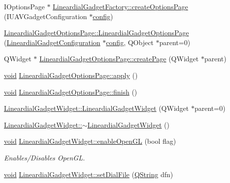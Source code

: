 \begin{DoxyCompactItemize}
\item 
I\-Options\-Page $\ast$ \hyperlink{group___linear_dial_plugin_gab8b7a7edac05d576e192c715acf48a22}{Lineardial\-Gadget\-Factory\-::create\-Options\-Page} (I\-U\-A\-V\-Gadget\-Configuration $\ast$\hyperlink{deflate_8c_a4473b5227787415097004fd39f55185e}{config})
\item 
\hyperlink{group___linear_dial_plugin_gaa49909f8404b5303882872f6bb8ccdb2}{Lineardial\-Gadget\-Options\-Page\-::\-Lineardial\-Gadget\-Options\-Page} (\hyperlink{class_lineardial_gadget_configuration}{Lineardial\-Gadget\-Configuration} $\ast$\hyperlink{deflate_8c_a4473b5227787415097004fd39f55185e}{config}, Q\-Object $\ast$parent=0)
\item 
Q\-Widget $\ast$ \hyperlink{group___linear_dial_plugin_ga7498a19341fff9fe87afe47efb379a00}{Lineardial\-Gadget\-Options\-Page\-::create\-Page} (Q\-Widget $\ast$parent)
\item 
\hyperlink{group___u_a_v_objects_plugin_ga444cf2ff3f0ecbe028adce838d373f5c}{void} \hyperlink{group___linear_dial_plugin_gace7e2623dbc910a445c0f4f772fb85cb}{Lineardial\-Gadget\-Options\-Page\-::apply} ()
\item 
\hyperlink{group___u_a_v_objects_plugin_ga444cf2ff3f0ecbe028adce838d373f5c}{void} \hyperlink{group___linear_dial_plugin_ga5afd30269776667128093b5ec5bef9de}{Lineardial\-Gadget\-Options\-Page\-::finish} ()
\item 
\hyperlink{group___linear_dial_plugin_ga67af774f5fa476bda0dce880d57348a7}{Lineardial\-Gadget\-Widget\-::\-Lineardial\-Gadget\-Widget} (Q\-Widget $\ast$parent=0)
\item 
\hyperlink{group___linear_dial_plugin_ga46b2275fc21a5a5fc14809f31be48674}{Lineardial\-Gadget\-Widget\-::$\sim$\-Lineardial\-Gadget\-Widget} ()
\item 
\hyperlink{group___u_a_v_objects_plugin_ga444cf2ff3f0ecbe028adce838d373f5c}{void} \hyperlink{group___linear_dial_plugin_ga6963a6b647b9d9def0497b60df89d576}{Lineardial\-Gadget\-Widget\-::enable\-Open\-G\-L} (bool flag)
\begin{DoxyCompactList}\small\item\em Enables/\-Disables Open\-G\-L. \end{DoxyCompactList}\item 
\hyperlink{group___u_a_v_objects_plugin_ga444cf2ff3f0ecbe028adce838d373f5c}{void} \hyperlink{group___linear_dial_plugin_ga5242e6b2ecad5fb0d80b13f5e989c671}{Lineardial\-Gadget\-Widget\-::set\-Dial\-File} (\hyperlink{group___u_a_v_objects_plugin_gab9d252f49c333c94a72f97ce3105a32d}{Q\-String} dfn)

\end{DoxyCompactItemize}
